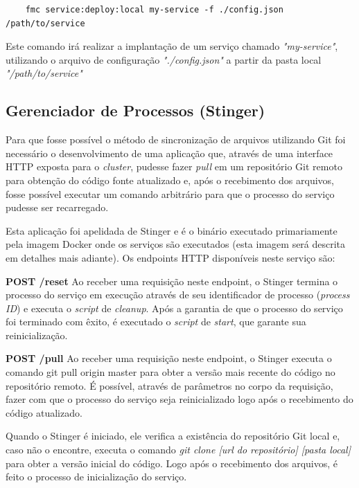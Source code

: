 \documentclass[twosideprint]{politex}
\begin{document}
	\begin{verbatim}
	fmc service:deploy:local my-service -f ./config.json /path/to/service
	\end{verbatim}

	Este comando irá realizar a implantação de um serviço chamado \textit{"my-service"}, utilizando o arquivo de configuração \textit{"./config.json"} a partir da pasta local \textit{"/path/to/service"}

	\subsection{Gerenciador de Processos (Stinger)}	
	
	Para que fosse possível o método de sincronização de arquivos utilizando Git foi necessário o desenvolvimento de uma aplicação que, através de uma interface HTTP exposta para o \textit{cluster}, pudesse fazer \textit{pull} em um repositório Git remoto para obtenção do código fonte atualizado e, após o recebimento dos arquivos, fosse possível executar um comando arbitrário para que o processo do serviço pudesse ser recarregado.
	
	Esta aplicação foi apelidada de Stinger e é o binário executado primariamente pela imagem Docker onde os serviços são executados (esta imagem será descrita em detalhes mais adiante). Os endpoints HTTP disponíveis neste serviço são:

    \textbf{POST /reset}
	\newline
	Ao receber uma requisição neste endpoint, o Stinger termina o processo do serviço em execução através de seu identificador de processo (\textit{process ID}) e executa o \textit{script} de \textit{cleanup}. Após a garantia de que o processo do serviço foi terminado com êxito, é executado o \textit{script} de \textit{start}, que garante sua reinicialização.
	
	\textbf{POST /pull}
	\newline
	Ao receber uma requisição neste endpoint, o Stinger executa o comando git pull origin master para obter a versão mais recente do código no repositório remoto. É possível, através de parâmetros no corpo da requisição, fazer com que o processo do serviço seja reinicializado logo após o recebimento do código atualizado.

	Quando o Stinger é iniciado, ele verifica a existência do repositório Git local e, caso não o encontre, executa o comando \textit{git clone [url do repositório] [pasta local]} para obter a versão inicial do código. Logo após o recebimento dos arquivos, é feito o processo de inicialização do serviço.
\end{document}
